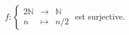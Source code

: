 $f:\left\{\begin{array}{ccc}2\mathbb{N} & \to & \mathbb{N} \\n & \mapsto & n/2\end{array}\right.$ est surjective.

\begin{reponses}
\end{reponses}

